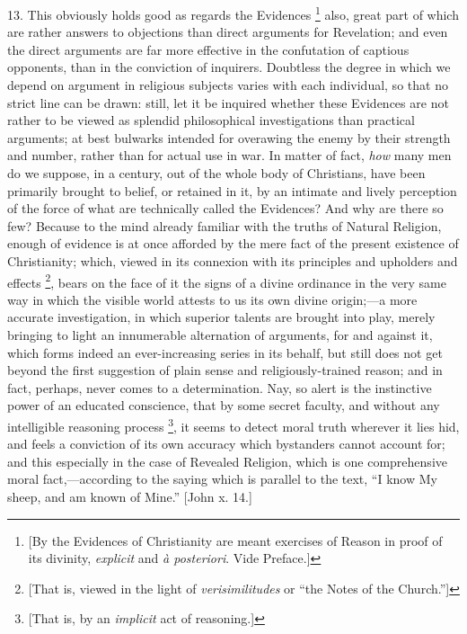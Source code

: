 13. This obviously holds good as regards the Evidences \footnote{[By the
Evidences of Christianity are meant exercises of Reason in proof of
its divinity, \emph{explicit} and \emph{à posteriori}. Vide Preface.]} also, great part of which are rather answers to objections
than direct arguments for Revelation; and even the direct arguments
are far more effective in the confutation of captious opponents, than
in the conviction of inquirers. Doubtless the degree in which we
depend on argument in religious subjects varies with each individual,
so that no strict line can be drawn: still, let it be inquired whether
these Evidences are not rather to be viewed as splendid philosophical
investigations than practical arguments; at best bulwarks intended for
overawing the enemy by their strength and number, rather than for
actual use in war. In matter of fact, \emph{how} many men do we suppose, in a
century, out of the whole body of Christians, have been primarily
brought to belief, or retained in it, by an intimate and lively
perception of the force of what are technically called the Evidences?
And why are there so few? Because to the mind already familiar with
the truths of Natural Religion, enough of evidence is at once afforded
by the mere fact of the present existence of Christianity; which,
viewed in its connexion with its principles and upholders and effects
\footnote{[That is,
viewed in the light of \emph{verisimilitudes} or ``the Notes of
the Church.'']}, bears on the face of
it the signs of a divine ordinance in the very same way in which the
visible world attests to us its own divine origin;—a more accurate
investigation, in which superior talents are brought into play, merely
bringing to light an innumerable alternation of arguments, for and
against it, which forms indeed an ever-increasing series in its
behalf, but still does not get beyond the first suggestion of plain
sense and religiously-trained reason; and in fact, perhaps, never
comes to a determination. Nay, so alert is the instinctive power of an
educated conscience, that by some secret faculty, and without any
intelligible reasoning process \footnote{[That is, by
an \emph{implicit} act of reasoning.]}, it seems to detect moral truth wherever it lies hid, and
feels a conviction of its own accuracy which bystanders cannot account
for; and this especially in the case of Revealed Religion, which is
one comprehensive moral fact,—according to the saying which is
parallel to the text, ``I know My sheep, and am known of
Mine.'' [John x. 14.]

